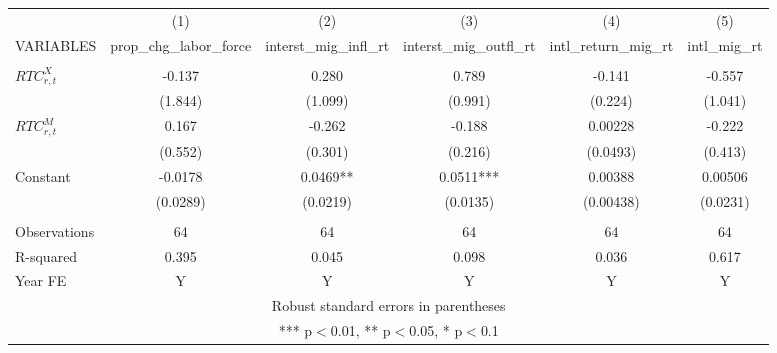 \begin{tabular}{lccccc} \hline
 & (1) & (2) & (3) & (4) & (5) \\
VARIABLES & prop\_chg\_labor\_force & interst\_mig\_infl\_rt & interst\_mig\_outfl\_rt & intl\_return\_mig\_rt & intl\_mig\_rt \\ \hline
 &  &  &  &  &  \\
$ RTC_{r,t}^X$ & -0.137 & 0.280 & 0.789 & -0.141 & -0.557 \\
 & (1.844) & (1.099) & (0.991) & (0.224) & (1.041) \\
$ RTC_{r,t}^M$ & 0.167 & -0.262 & -0.188 & 0.00228 & -0.222 \\
 & (0.552) & (0.301) & (0.216) & (0.0493) & (0.413) \\
Constant & -0.0178 & 0.0469** & 0.0511*** & 0.00388 & 0.00506 \\
 & (0.0289) & (0.0219) & (0.0135) & (0.00438) & (0.0231) \\
 &  &  &  &  &  \\
Observations & 64 & 64 & 64 & 64 & 64 \\
R-squared & 0.395 & 0.045 & 0.098 & 0.036 & 0.617 \\
 Year FE & Y & Y & Y & Y & Y \\ \hline
\multicolumn{6}{c}{ Robust standard errors in parentheses} \\
\multicolumn{6}{c}{ *** p$<$0.01, ** p$<$0.05, * p$<$0.1} \\
\end{tabular}
